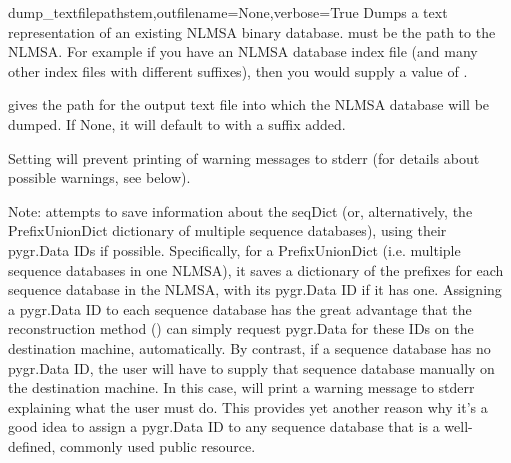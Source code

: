 \documentclass{howto}
\begin{document}
\begin{funcdesc}{dump_textfile}{pathstem,outfilename=None,verbose=True}
  Dumps a text representation of an existing NLMSA binary database.
   must be the path to the NLMSA.  For
  example if you have an NLMSA database index file 
  (and many other index files with different suffixes),
  then you would supply a  value of .

   gives the path for the output text file into which the
  NLMSA database will be dumped.  If None, it will default to  with a
   suffix added.

  Setting  will prevent printing of warning messages
  to stderr (for details about possible warnings, see below).

  Note:  attempts to save information about the seqDict 
  (or, alternatively, the PrefixUnionDict dictionary of multiple sequence
  databases), using their pygr.Data IDs if possible.
  Specifically, for a PrefixUnionDict (i.e. multiple sequence databases in
  one NLMSA), it saves a dictionary of the prefixes
  for each sequence database in the NLMSA, with its pygr.Data ID if it has one.
  Assigning a pygr.Data ID to each sequence database has the great advantage that
  the reconstruction method () can simply request
  pygr.Data for these IDs on the destination machine, automatically.  By contrast,
  if a sequence database has no pygr.Data ID, the user will have to supply that
  sequence database manually on the destination machine.  In this case, 
   will print a warning message to stderr explaining
  what the user must do.  This provides yet another reason why it's a good idea
  to assign a pygr.Data ID to any sequence database that is a well-defined,
  commonly used public resource.
\end{funcdesc}
\end{document}
